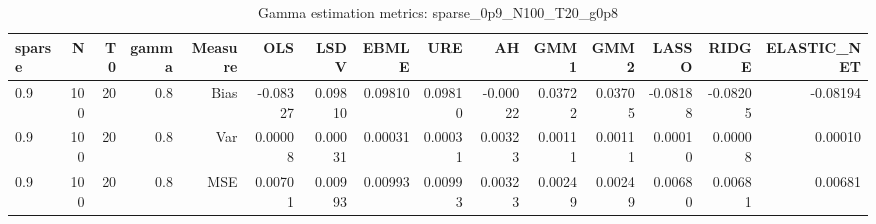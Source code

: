 \begin{table}[!htbp]\centering
\caption{Gamma estimation metrics: sparse_0p9_N100_T20_g0p8}
\label{tab:table1_sparse_0p9_N100_T20_g0p8}
\begin{tabular}{lrrrrrrrrrrrrrr}
\hline
sparse & N & T0 & gamma & Measure & OLS & LSDV & EBMLE & URE & AH & GMM1 & GMM2 & LASSO & RIDGE & ELASTIC_NET \\
\hline
0.9 & 100 & 20 & 0.8 & Bias & -0.08327 & 0.09810 & 0.09810 & 0.09810 & -0.00022 & 0.03722 & 0.03705 & -0.08188 & -0.08205 & -0.08194 \\
0.9 & 100 & 20 & 0.8 & Var & 0.00008 & 0.00031 & 0.00031 & 0.00031 & 0.00323 & 0.00111 & 0.00111 & 0.00010 & 0.00008 & 0.00010 \\
0.9 & 100 & 20 & 0.8 & MSE & 0.00701 & 0.00993 & 0.00993 & 0.00993 & 0.00323 & 0.00249 & 0.00249 & 0.00680 & 0.00681 & 0.00681 \\
\hline
\end{tabular}
\end{table}

